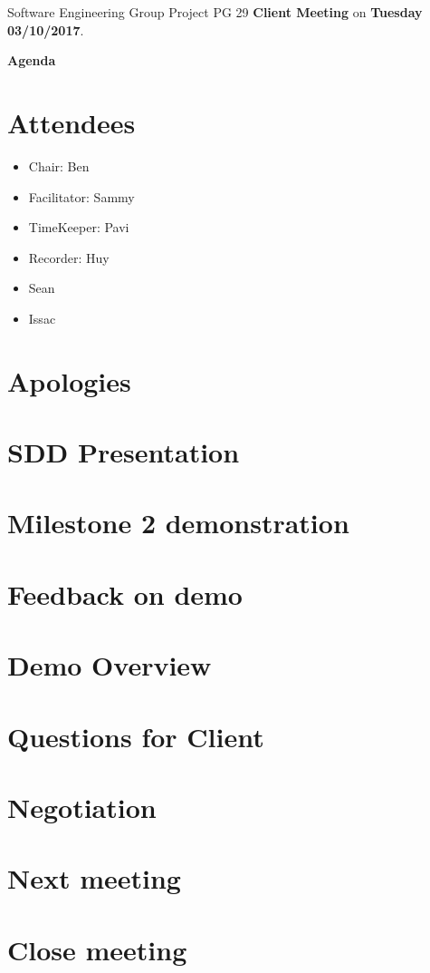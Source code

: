 \documentclass[11pt, a4paper]{article}
\begin{document}
\noindent Software Engineering Group Project PG 29 {\bf Client Meeting} on {\bf Tuesday 03/10/2017}.
\vspace*{10pt}
\begin{center}
\huge \bf Agenda
\end{center}

\section{Attendees}
\begin{itemize}
\item Chair: Ben
\item Facilitator: Sammy
\item TimeKeeper: Pavi 
\item Recorder: Huy
\item Sean
\item Issac
\end{itemize}

\section{Apologies}

\section{SDD Presentation}


\section{Milestone 2 demonstration}

\section{Feedback on demo} 

\section{Demo Overview}


\section{Questions for Client}


\section{Negotiation}


\section{Next meeting}

\section {Close meeting}
\vspace*{10pt}
\end{document}
